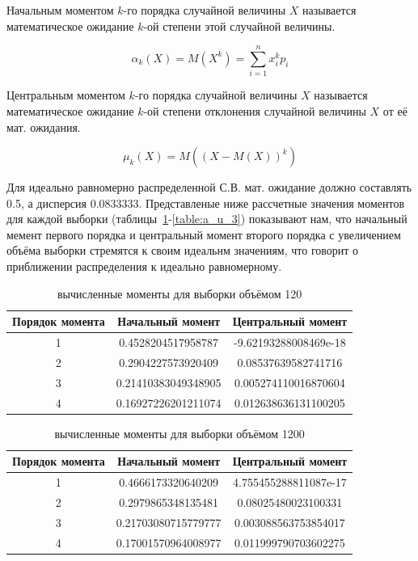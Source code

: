 \documentclass[a4paper,12pt]{article}
\begin{document}
Начальным моментом $k$-го порядка случайной величины $X$ называется математическое ожидание $k$-ой степени этой случайной величины.

{\large $$\alpha_k(X) = M(X^k) = \sum\limits_{i=1}^n x_i^k p_i$$}

Центральным моментом $k$-го порядка случайной величины $X$ называется математическое ожидание $k$-ой степени отклонения случайной величины $X$ от её мат. ожидания.

{\large $$\mu_k(X) = M\left(\left(X-M\left(X\right)\right)^k\right)$$}

Для идеально равномерно распределенной С.В. мат. ожидание должно составлять 0.5, а дисперсия 0.0833333. Представленые ниже рассчетные значения моментов для каждой выборки (таблицы~\ref{table:a_u_1}-\ref{table:a_u_3}) показывают нам, что начальный мемент первого порядка и центральный момент второго порядка с увеличением объёма выборки стремятся к своим идеальнм значениям, что говорит о приближении распределения к идеально равномерному.

\begin{table}[h]
	\caption{вычисленные моменты для выборки объёмом 120}
	\begin{tabular}{|c|c|c|}
	\hline 
	Порядок момента & Начальный момент & Центральный момент \\ 
	\hline 
	1 & 0.4528204517958787 & -9.62193288008469e-18 \\ 
	\hline 
	2 & 0.2904227573920409 & 0.08537639582741716 \\ 
	\hline 
	3 & 0.21410383049348905 & 0.005274110016870604 \\ 
	\hline 
	4 & 0.16927226201211074 & 0.012638636131100205 \\ 
	\hline 
	\end{tabular} 

	\label{table:a_u_1}
\end{table}

\begin{table}[h]
	\caption{вычисленные моменты для выборки объёмом 1200}
	\begin{tabular}{|c|c|c|}
	\hline 
	Порядок момента & Начальный момент & Центральный момент \\ 
	\hline 
	1 & 0.4666173320640209 & 4.755455288811087e-17 \\ 
	\hline 
	2 & 0.2979865348135481 & 0.08025480023100331 \\ 
	\hline 
	3 & 0.21703080715779777 & 0.003088563753854017 \\ 
	\hline 
	4 & 0.17001570964008977 & 0.011999790703602275 \\ 
	\hline 
	\end{tabular} 

	\label{table:a_u_2}
\end{table}
\end{document}

